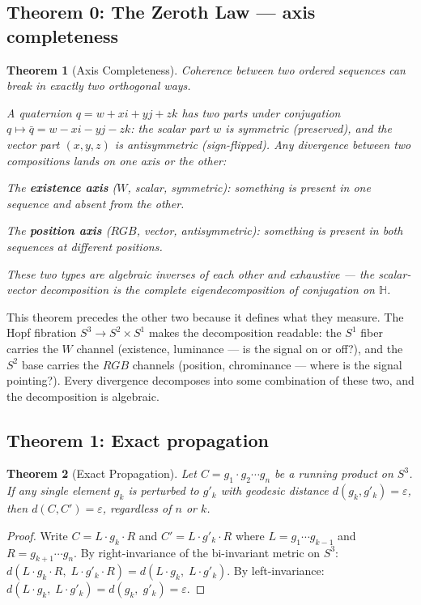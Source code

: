 \documentclass[12pt,a4paper]{article}
\newtheorem{theorem}{Theorem}
\begin{document}
\subsection{Theorem 0: The Zeroth Law --- axis completeness}

\begin{theorem}[Axis Completeness]
\label{thm:zeroth}
Coherence between two ordered sequences can break in exactly two orthogonal ways.

A quaternion $q = w + xi + yj + zk$ has two parts under conjugation $q \mapsto \bar{q} = w - xi - yj - zk$: the scalar part $w$ is symmetric (preserved), and the vector part $(x, y, z)$ is antisymmetric (sign-flipped). Any divergence between two compositions lands on one axis or the other:

The \textbf{existence axis} ($W$, scalar, symmetric): something is present in one sequence and absent from the other.

The \textbf{position axis} ($RGB$, vector, antisymmetric): something is present in both sequences at different positions.

These two types are algebraic inverses of each other and exhaustive --- the scalar-vector decomposition is the complete eigendecomposition of conjugation on $\mathbb{H}$.
\end{theorem}

This theorem precedes the other two because it defines what they measure. The Hopf fibration $S^3 \to S^2 \times S^1$ \cite{hopf1931} makes the decomposition readable: the $S^1$ fiber carries the $W$ channel (existence, luminance --- is the signal on or off?), and the $S^2$ base carries the $RGB$ channels (position, chrominance --- where is the signal pointing?). Every divergence decomposes into some combination of these two, and the decomposition is algebraic.

\subsection{Theorem 1: Exact propagation}

\begin{theorem}[Exact Propagation]
\label{thm:exact}
Let $C = g_1 \cdot g_2 \cdots g_n$ be a running product on $S^3$. If any single element $g_k$ is perturbed to $g'_k$ with geodesic distance $d(g_k, g'_k) = \varepsilon$, then $d(C, C') = \varepsilon$, regardless of $n$ or $k$.
\end{theorem}

\begin{proof}
Write $C = L \cdot g_k \cdot R$ and $C' = L \cdot g'_k \cdot R$ where $L = g_1 \cdots g_{k-1}$ and $R = g_{k+1} \cdots g_n$. By right-invariance of the bi-invariant metric on $S^3$: $d(L \cdot g_k \cdot R,\; L \cdot g'_k \cdot R) = d(L \cdot g_k,\; L \cdot g'_k)$. By left-invariance: $d(L \cdot g_k,\; L \cdot g'_k) = d(g_k,\; g'_k) = \varepsilon$.
\end{proof}
\end{document}
